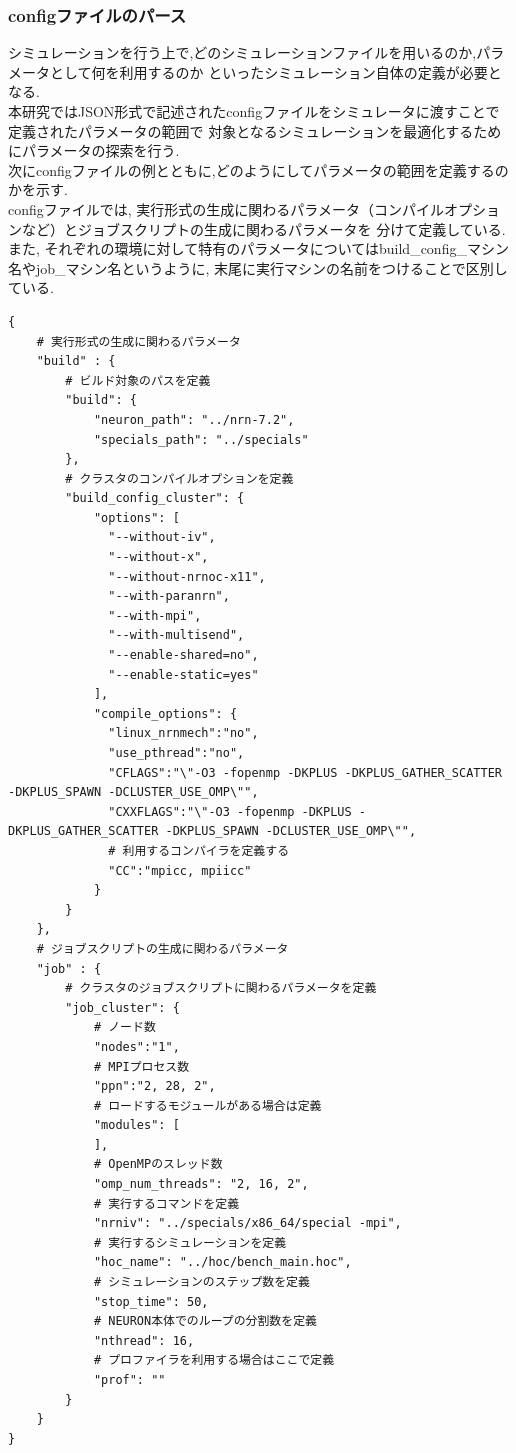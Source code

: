 \subsubsection{configファイルのパース}
\label{sec:simulator-config-parse}
シミュレーションを行う上で,どのシミュレーションファイルを用いるのか,パラメータとして何を利用するのか
といったシミュレーション自体の定義が必要となる.\\
本研究ではJSON形式で記述されたconfigファイルをシミュレータに渡すことで定義されたパラメータの範囲で
対象となるシミュレーションを最適化するためにパラメータの探索を行う.\\
次にconfigファイルの例とともに,どのようにしてパラメータの範囲を定義するのかを示す.\\
configファイルでは, 実行形式の生成に関わるパラメータ（コンパイルオプションなど）とジョブスクリプトの生成に関わるパラメータを
分けて定義している.\\
また, それぞれの環境に対して特有のパラメータについてはbuild\_config\_マシン名やjob\_マシン名というように,
末尾に実行マシンの名前をつけることで区別している.\\
{\footnotesize
\begin{lstlisting}[numbers=none, caption=クラスタに対するconfigファイル]
{
    # 実行形式の生成に関わるパラメータ
    "build" : {
        # ビルド対象のパスを定義
        "build": {
            "neuron_path": "../nrn-7.2",
            "specials_path": "../specials"
        },
        # クラスタのコンパイルオプションを定義
        "build_config_cluster": {
            "options": [
              "--without-iv",
              "--without-x",
              "--without-nrnoc-x11",
              "--with-paranrn",
              "--with-mpi",
              "--with-multisend",
              "--enable-shared=no",
              "--enable-static=yes"
            ],
            "compile_options": {
              "linux_nrnmech":"no",
              "use_pthread":"no",
              "CFLAGS":"\"-O3 -fopenmp -DKPLUS -DKPLUS_GATHER_SCATTER -DKPLUS_SPAWN -DCLUSTER_USE_OMP\"",
              "CXXFLAGS":"\"-O3 -fopenmp -DKPLUS -DKPLUS_GATHER_SCATTER -DKPLUS_SPAWN -DCLUSTER_USE_OMP\"",
              # 利用するコンパイラを定義する
              "CC":"mpicc, mpiicc"
            }
        }
    },
    # ジョブスクリプトの生成に関わるパラメータ
    "job" : {
        # クラスタのジョブスクリプトに関わるパラメータを定義
        "job_cluster": {
            # ノード数
            "nodes":"1",
            # MPIプロセス数
            "ppn":"2, 28, 2",
            # ロードするモジュールがある場合は定義
            "modules": [
            ],
            # OpenMPのスレッド数
            "omp_num_threads": "2, 16, 2",
            # 実行するコマンドを定義
            "nrniv": "../specials/x86_64/special -mpi",
            # 実行するシミュレーションを定義
            "hoc_name": "../hoc/bench_main.hoc",
            # シミュレーションのステップ数を定義
            "stop_time": 50,
            # NEURON本体でのループの分割数を定義
            "nthread": 16,
            # プロファイラを利用する場合はここで定義
            "prof": ""
        }
    }
}
\end{lstlisting}
}

